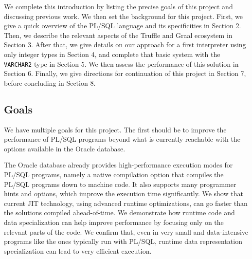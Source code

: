 \documentclass[twoside,11pt,a4paper]{article}
\newcommand{\pls}[1]{\small\texttt{#1}\normalsize}
\newcommand{\plstype}[1]{\pls{#1}}
\newcommand{\varchar}{\plstype{VARCHAR2}}
\begin{document}
We complete this introduction by listing the precise goals of this project and discussing previous work. We then set the background for this project. First, we give a quick overview of the PL/SQL language and its specificities in Section 2. Then, we describe the relevant aspects of the Truffle and Graal ecosystem in Section 3. After that, we give details on our approach for a first interpreter using only integer types in Section 4, and complete that basic system with the \varchar{} type in Section 5. We then assess the performance of this solution in Section 6. Finally, we give directions for continuation of this project in Section 7, before concluding in Section 8.

\subsection{Goals}


We have multiple goals for this project. The first should be to improve the performance of PL/SQL programs beyond what is currently reachable with the options available in the Oracle database.

The Oracle database already provides high-performance execution modes for PL/SQL programs, namely a native compilation option that compiles the PL/SQL programs down to machine code. It also supports many programmer hints and options, which improve the execution time significantly. We show that current JIT technology, using advanced runtime optimizations, can go faster than the solutions compiled ahead-of-time. We demonstrate how runtime code and data specialization can help improve performance by focusing only on the relevant parts of the code. We confirm that, even in very small and data-intensive programs like the ones typically run with PL/SQL, runtime data representation specialization can lead to very efficient execution.
\end{document}
